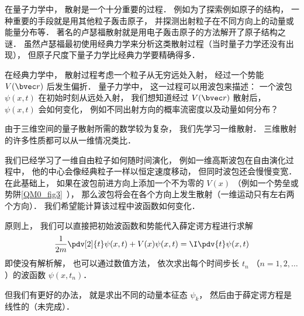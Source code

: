 
\begin{issues}
\issueDraft
\end{issues}


在量子力学中， 散射是一个十分重要的过程． 例如为了探索例如原子的结构， 一种重要的手段就是用其他粒子轰击原子， 并探测出射粒子在不同方向上的动量或能量分布等． 著名的卢瑟福散射就是用电子轰击原子的方法解开了原子结构之谜． 虽然卢瑟福最初使用经典力学来分析这类散射过程（当时量子力学还没有出现）， 但原子尺度下量子力学比经典力学要精确得多．

在经典力学中， 散射过程考虑一个粒子从无穷远处入射， 经过一个势能 $V(\bvec r)$ 后发生偏折． 量子力学中， 这一过程可以用波包来描述： 一个波包 $\psi(x, t)$ 在初始时刻从远处入射， 我们想知道经过 $V(\bvec r)$ 散射后， $\psi(x, t)$ 会如何变化， 例如不同出射方向的概率流密度以及动量如何分布？

由于三维空间的量子散射所需的数学较为复杂， 我们先学习一维散射． 三维散射的许多性质都可以从一维情况类比．

我们已经学习了一维自由粒子如何随时间演化， 例如一维高斯波包在自由演化过程中， 他的中心会像经典粒子一样以恒定速度移动， 但同时波包还会慢慢变宽． 在此基础上， 如果在波包前进方向上添加一个不为零的 $V(x)$ （例如一个势垒或势阱\autoref{QM0_fig3}~）， 那么波包将会在各个方向上发生散射（一维运动只有左右两个方向）． 我们希望能计算该过程中波函数如何变化．

原则上， 我们可以直接把初始波函数和势能代入薛定谔方程进行求解
\begin{equation}
\frac{1}{2m}\pdv[2]{t}\psi(x, t) + V(x) \psi(x, t) = \I \pdv{t} \psi(x, t)
\end{equation}
即使没有解析解， 也可以通过数值方法， 依次求出每个时间步长 $t_n$ （$n = 1, 2, \dots$）的波函数 $\psi(x, t_n)$．

但我们有更好的办法， 就是求出不同的动量本征态 $\psi_k$， 然后由于薛定谔方程是线性的（未完成）．

